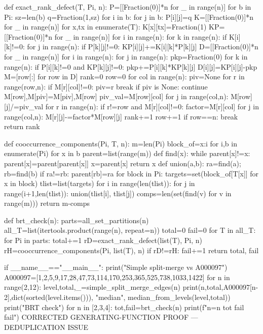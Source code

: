 def exact_rank_defect(T, Pi, n):
    P=[[Fraction(0)]*n for _ in range(n)]
    for b in Pi:
        sz=len(b)
        q=Fraction(1,sz)
        for i in b:
            for j in b:
                P[i][j]=q
    K=[[Fraction(0)]*n for _ in range(n)]
    for x,tx in enumerate(T):
        K[x][tx]=Fraction(1)
    KP=[[Fraction(0)]*n for _ in range(n)]
    for i in range(n):
        for k in range(n):
            if K[i][k]!=0:
                for j in range(n):
                    if P[k][j]!=0:
                        KP[i][j]+=K[i][k]*P[k][j]
    D=[[Fraction(0)]*n for _ in range(n)]
    for i in range(n):
        for j in range(n):
            pkp=Fraction(0)
            for k in range(n):
                if P[i][k]!=0 and KP[k][j]!=0:
                    pkp+=P[i][k]*KP[k][j]
            D[i][j]=KP[i][j]-pkp
    M=[row[:] for row in D]
    rank=0
    row=0
    for col in range(n):
        piv=None
        for r in range(row,n):
            if M[r][col]!=0:
                piv=r
                break
        if piv is None:
            continue
        M[row],M[piv]=M[piv],M[row]
        piv_val=M[row][col]
        for j in range(col,n):
            M[row][j]/=piv_val
        for r in range(n):
            if r!=row and M[r][col]!=0:
                factor=M[r][col]
                for j in range(col,n):
                    M[r][j]-=factor*M[row][j]
        rank+=1
        row+=1
        if row==n:
            break
    return rank

def cooccurrence_components(Pi, T, n):
    m=len(Pi)
    block_of={x:i for i,b in enumerate(Pi) for x in b}
    parent=list(range(m))
    def find(x):
        while parent[x]!=x:
            parent[x]=parent[parent[x]]
            x=parent[x]
        return x
    def union(a,b):
        ra=find(a); rb=find(b)
        if ra!=rb:
            parent[rb]=ra
    for block in Pi:
        targets=set(block_of[T[x]] for x in block)
        tlist=list(targets)
        for i in range(len(tlist)):
            for j in range(i+1,len(tlist)):
                union(tlist[i], tlist[j])
    comps=len(set(find(v) for v in range(m)))
    return m-comps

def brt_check(n):
    parts=all_set_partitions(n)
    all_T=list(itertools.product(range(n), repeat=n))
    total=0
    fail=0
    for T in all_T:
        for Pi in parts:
            total+=1
            rD=exact_rank_defect(list(T), Pi, n)
            rH=cooccurrence_components(Pi, list(T), n)
            if rD!=rH:
                fail+=1
    return total, fail

if __name__=="__main__":
    print("Simple split-merge vs A000097")
    A000097=[1,2,5,9,17,28,47,73,114,170,253,365,525,738,1033,1422]
    for n in range(2,12):
        level,total,_=simple_split_merge_edges(n)
        print(n,total,A000097[n-2],dict(sorted(level.items())), "median", median_from_levels(level,total))
    print("BRT check")
    for n in [2,3,4]:
        tot,fail=brt_check(n)
        print(f"n={n} {tot} fail {fail}")
CORRECTED GENERATING-FUNCTION PROOF — DEDUPLICATION ISSUE

